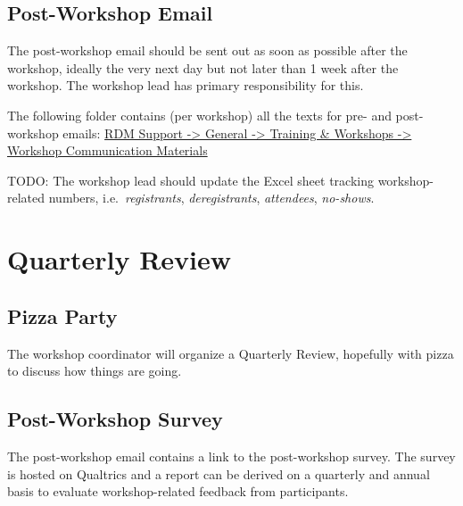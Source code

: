 \documentclass[
  letterpaper,
  DIV=11,
  numbers=noendperiod]{scrreprt}
\begin{document}

\subsection*{Post-Workshop Email}\label{post-workshop-email}

The post-workshop email should be sent out as soon as possible after the
workshop, ideally the very next day but not later than 1 week after the
workshop. The workshop lead has primary responsibility for this.

The following folder contains (per workshop) all the texts for pre- and
post-workshop emails:
\href{https://solisservices.sharepoint.com/:f:/r/sites/RDMSpeeltuin/Shared\%20Documents/General/Trainings\%20and\%20Workshops/Workshop\%20Communication\%20Materials?csf=1&web=1&e=dab1La}{RDM
Support -\textgreater{} General -\textgreater{} Training \& Workshops
-\textgreater{} Workshop Communication Materials}

TODO: The workshop lead should update the Excel sheet tracking
workshop-related numbers, i.e.~\emph{registrants}, \emph{deregistrants},
\emph{attendees}, \emph{no-shows}.

\section*{Quarterly Review}\label{quarterly-review}


\subsection*{Pizza Party}\label{pizza-party}

The workshop coordinator will organize a Quarterly Review, hopefully
with pizza to discuss how things are going.

\subsection*{Post-Workshop Survey}\label{post-workshop-survey}

The post-workshop email contains a link to the post-workshop survey. The
survey is hosted on Qualtrics and a report can be derived on a quarterly
and annual basis to evaluate workshop-related feedback from
participants.
\end{document}
